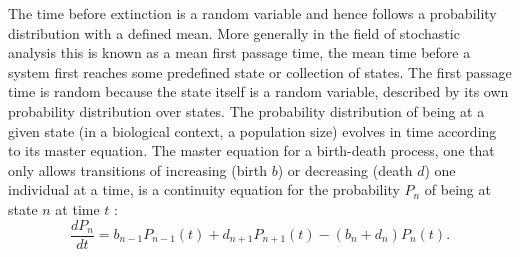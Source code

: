 The time before extinction is a random variable and hence follows a probability distribution with a defined mean. 
More generally in the field of stochastic analysis this is known as a mean first passage time, the mean time before a system first reaches some predefined state or collection of states. 
The first passage time is random because the state itself is a random variable, described by its own probability distribution over states. 
The probability distribution of being at a given state (in a biological context, a population size) evolves in time according to its master equation. 
The master equation for a birth-death process, one that only allows transitions of increasing (birth $b$) or decreasing (death $d$) one individual at a time, is a continuity equation for the probability $P_n$ of being at state $n$ at time $t$ \cite{Nisbet1982,Gardiner2004a}:
\begin{equation}
\frac{dP_n}{dt} =  b_{n-1}P_{n-1}(t) + d_{n+1}P_{n+1}(t) - (b_n+d_n)P_n(t).
\label{master-eqn-intro}
\end{equation}
\fi
\iffalse
\begin{figure}[h]
	\centering
	\texttt{[image: lattice-fig1]}
	\caption{\emph{Each realization of a birth-death process is a random walk on a lattice.} Each node of the lattice corresponds to a population size. Birth jumps the system one node to the right and death moves it one left, toward the absorbing state at zero population. A system with one species only need a one dimensional lattice; each additional species requires an additional dimension to represent the combination of populations for each species. The master equation describes how a probability distribution on the lattice evolves in time. 
	} \label{latticefig}
\end{figure}
\fi

